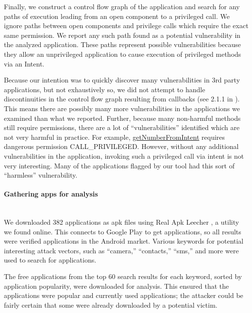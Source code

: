 \documentclass[12pt,a4paper]{article}
\begin{document}
Finally, we construct a control flow graph of the application and search for any
paths of execution leading from an open component to a privileged call. We
ignore paths between open components and privilege calls which require the exact
same permission. We report any such path found as a potential vulnerability in
the analyzed application. These paths represent possible vulnerabilities because
they allow an unprivileged application to cause execution of privileged methods
via an Intent.

Because our intention was to quickly discover many vulnerabilities in 3rd party
applications, but not exhaustively so, we did not attempt to handle
discontinuities in the control flow graph resulting from callbacks (see 2.1.1 in
\cite{grace_systematic_2012}). This means there are possibly many more
vulnerabilities in the applications we examined than what we reported. Further,
because many non-harmful methods still require permissions, there are a lot of
``vulnerabilities'' identified which are not very harmful in practice.  For
example,
\href{https://developer.android.com/reference/android/telephony/PhoneNumberUtils.html#getNumberFromIntent\%28android.content.Intent,\%20android.content.Context\%29}{getNumberFromIntent}
requires dangerous permission CALL\_PRIVILEGED. However, without any additional
vulnerabilities in the application, invoking such a privileged call via intent
is not very interesting. Many of the applications flagged by our tool had this
sort of ``harmless'' vulnerability.

\paragraph{Gathering apps for analysis} ~\\
We downloaded 382 applications as apk files using Real Apk Leecher
\cite{apkleecher}, a utility we found online. This connects to Google Play to
get applications, so all results were verified applications in the Android
market. Various keywords for potential interesting attack vectors, such as
``camera,'' ``contacts,'' ``sms,'' and more were used to search for
applications.

The free applications from the top 60 search results for each keyword, sorted by
application popularity, were downloaded for analysis. This ensured that the
applications were popular and currently used applications; the attacker could be
fairly certain that some were already downloaded by a potential victim.
\end{document}
